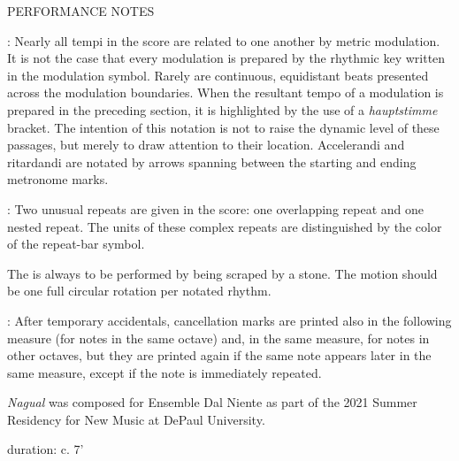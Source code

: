 \documentclass[11pt]{article}
\begin{document}
\begin{center}
\huge PERFORMANCE NOTES
\end{center}
\begingroup
\begin{center}

 : Nearly all tempi in the score are related to one another by metric modulation. It is not the case that every modulation is prepared by the rhythmic key written in the modulation symbol. Rarely are continuous, equidistant beats presented across the modulation boundaries. When the resultant tempo of a modulation is prepared in the preceding section, it is highlighted by the use of a \textit{hauptstimme} bracket. The intention of this notation is not to raise the dynamic level of these passages, but merely to draw attention to their location. Accelerandi and ritardandi are notated by arrows spanning between the starting and ending metronome marks.
\rightskip\leftskip
\phantom{text} \hfill \phantom{()}

 : Two unusual repeats are given in the score: one overlapping repeat and one nested repeat. The units of these complex repeats are distinguished by the color of the repeat-bar symbol.
\rightskip\leftskip
\phantom{text} \hfill \phantom{()}

The  is always to be performed by being scraped by a stone. The motion should be one full circular rotation per notated rhythm.
\rightskip\leftskip
\phantom{text} \hfill \phantom{()}

 : After temporary accidentals, cancellation marks are printed also in the following measure (for notes in the same octave) and, in the same measure, for notes in other octaves, but they are printed again if the same note appears later in the same measure, except if the note is immediately repeated.
\rightskip\leftskip
\phantom{text} \hfill \phantom{()}
\end{center}
\endgroup

\vspace*{9\baselineskip}

\begin{center}
\textit{Nagual} was composed for Ensemble Dal Niente as part of the 2021 Summer Residency for New Music at DePaul University.
\rightskip\leftskip
\phantom{text} \hfill \phantom{()}
\end{center}

\vspace*{26\baselineskip}

\begin{center}
duration: c. 7'
\end{center}
\end{document}
